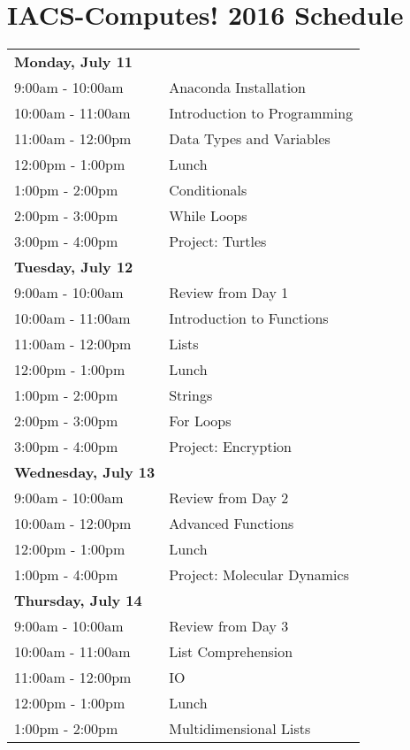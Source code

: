 \documentclass{article}
\begin{document}


\section*{\hfil IACS-Computes! 2016 Schedule \hfil}

\begin{tabu} to \textwidth {l X[r]}
\textbf{Monday, July 11} & \\
9:00am - 10:00am & Anaconda Installation \\
10:00am - 11:00am & Introduction to Programming \\
11:00am - 12:00pm & Data Types and Variables \\
12:00pm - 1:00pm & Lunch \\
1:00pm - 2:00pm & Conditionals \\
2:00pm - 3:00pm & While Loops \\
3:00pm - 4:00pm & Project: Turtles \\
\textbf{Tuesday, July 12} & \\
9:00am - 10:00am & Review from Day 1 \\
10:00am - 11:00am & Introduction to Functions \\
11:00am - 12:00pm & Lists \\
12:00pm - 1:00pm & Lunch \\
1:00pm - 2:00pm & Strings \\
2:00pm - 3:00pm & For Loops \\
3:00pm - 4:00pm & Project: Encryption \\
\textbf{Wednesday, July 13} & \\
9:00am - 10:00am & Review from Day 2 \\
10:00am - 12:00pm & Advanced Functions \\
12:00pm - 1:00pm & Lunch \\
1:00pm - 4:00pm & Project: Molecular Dynamics \\
\textbf{Thursday, July 14} & \\
9:00am - 10:00am & Review from Day 3 \\
10:00am - 11:00am & List Comprehension \\
11:00am - 12:00pm & IO \\
12:00pm - 1:00pm & Lunch \\
1:00pm - 2:00pm & Multidimensional Lists \\

\end{tabu}
\end{document}
